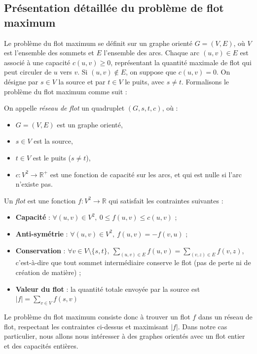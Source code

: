 \documentclass[a4paper]{article}
\begin{document}
\subsection{Présentation détaillée du problème de flot maximum}
Le problème du flot maximum se définit sur un graphe orienté $G = (V, E)$, où $V$ est l’ensemble des sommets et $E$ l’ensemble des arcs. Chaque arc $(u, v) \in E$ est associé à une capacité $c(u, v) \geq 0$, représentant la quantité maximale de flot qui peut circuler de $u$ vers $v$. Si $(u, v)\notin E$, on suppose que $c(u, v) = 0$. On désigne par $s \in V$ la source et par $t \in V$ le puits, avec $s \neq t$. Formalisons le problème du flot maximum comme suit :
\begin{definition}
	On appelle \emph{réseau de flot} un quadruplet $(G, s, t, c)$, où :
\begin{itemize}
    \item $G = (V,E)$ est un graphe orienté,
    \item $s \in V$ est la source,
    \item $t \in V$ est le puits ($s \neq t$),
    \item $c : V^2 \to \mathbb{R}^+$ est une fonction de capacité sur les arcs, et qui est nulle si l’arc n’existe pas.
\end{itemize}
\end{definition}
\begin{definition}[Flot]
	Un \emph{flot} est une fonction $f : V^2 \to \mathbb{R}$ qui satisfait les contraintes suivantes :
\begin{itemize}
    \item \textbf{Capacité} : $\forall (u, v) \in V^2,\ 0 \leq f(u, v) \leq c(u, v)$ ;
    \item \textbf{Anti-symétrie} : $\forall (u, v) \in V^2,\ f(u, v) = -f(v, u)$ ;
    \item \textbf{Conservation} : $\forall v \in V \setminus \{s, t\},\ \displaystyle\sum_{(u, v) \in E} f(u, v) = \sum_{(v, z) \in E} f(v, z)$, c’est-à-dire que tout sommet intermédiaire conserve le flot (pas de perte ni de création de matière) ;
    \item \textbf{Valeur du flot} : la quantité totale envoyée par la source est $|f| = \displaystyle\sum_{v \in V} f(s, v)$
\end{itemize}
\end{definition}
Le problème du flot maximum consiste donc à trouver un flot $f$ dans un réseau de flot, respectant les contraintes ci-dessus et maximisant $|f|$. Dans notre cas particulier, nous allons nous intéresser à des graphes orientés avec un flot entier et des capacités entières.
\end{document}
